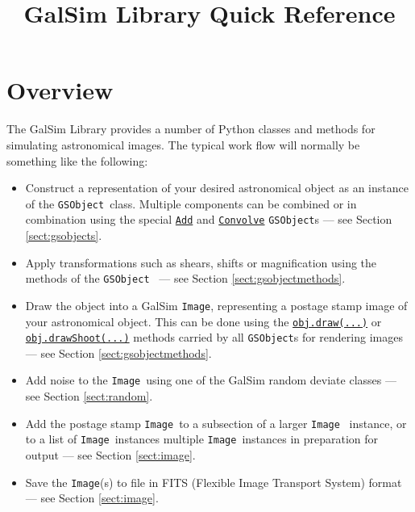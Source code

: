 \documentclass[preprint,11pt]{aastex}
\newcommand{\gsobject}{{\tt GSObject}}
\newcommand{\image}{{\tt Image}}
\begin{document}
\setlength{\parskip}{2.0ex plus 0.5ex minus 0.5ex}
\setlength{\parindent}{0cm} 

\title{GalSim Library Quick Reference}

\section{Overview}


The GalSim Library provides a number of Python classes and methods for
simulating astronomical images.  The typical work flow will
normally be something like the following:
\begin{itemize}

\item Construct a representation of your desired astronomical object
  as an instance of the \gsobject~class.  Multiple components
  can be combined or in combination using the special
  \href{http://galsim-developers.github.com/GalSim/classgalsim_1_1base_1_1_add.html}{\texttt{Add}}
  and
  \href{http://galsim-developers.github.com/GalSim/classgalsim_1_1base_1_1_convolve.html}{\texttt{Convolve}}
  \gsobject s --- see Section \ref{sect:gsobjects}.
\item Apply transformations such as shears, shifts or
  magnification using the methods of the \gsobject~
  --- see Section \ref{sect:gsobjectmethods}.
\item Draw the object into a GalSim \image, representing a postage
  stamp image of your astronomical object.  This can be done using the
  \href{http://galsim-developers.github.com/GalSim/classgalsim_1_1base_1_1_g_s_object.html#ae0b346a8b438dedbc7f60a52220869d8}{\texttt{obj.draw(...)}}
  or
  \href{http://galsim-developers.github.com/GalSim/classgalsim_1_1base_1_1_g_s_object.html#a42ac334d2840ba3fa832988e998beca0}{\texttt{obj.drawShoot(...)}}
  methods carried by all \gsobject s for rendering images --- see
  Section \ref{sect:gsobjectmethods}.
\item Add noise to the \image~using one of the GalSim
  random deviate classes --- see Section \ref{sect:random}.
\item Add the postage stamp \image~to a subsection of
  a larger \image~ instance, or to a list of \texttt{Image}~instances
  multiple \image~instances in preparation for output --- see Section \ref{sect:image}.
\item Save the \image (s) to file in FITS (Flexible Image Transport
  System) format --- see Section \ref{sect:image}.
\end{itemize}
\end{document}

